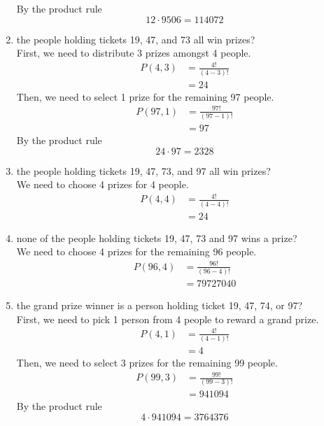 \documentclass[a4paper]{article}
\begin{document}
\begin{enumerate}[label = \textbf{\alph*)}]
		By the product rule
		\begin{equation*}
		12 \cdot 9506 = 114072
		\end{equation*}
		\item the people holding tickets 19, 47, and 73 all win prizes? \\
		First, we need to distribute 3 prizes amongst 4 people.
		\begin{align*}
		P(4,3) & = \frac{4!}{(4-3)!} \\
		& = 24 
		\end{align*}
		Then, we need to select 1 prize for the remaining 97 people.
		\begin{align*}
		P(97,1) & = \frac{97!}{(97-1)!} \\
		& = 97
		\end{align*}
		By the product rule
		\begin{equation*}
		24 \cdot 97 = 2328
		\end{equation*}
		\item the people holding tickets 19, 47, 73, and 97 all win prizes? \\
		We need to choose 4 prizes for 4 people.
		\begin{align*}
		P(4,4) & = \frac{4!}{(4-4)!} \\
		& = 24
		\end{align*}
		\item none of the people holding tickets 19, 47, 73 and 97 wins a prize? \\
		We need to choose 4 prizes for the remaining 96 people.
		\begin{align*}
		P(96,4) & = \frac{96!}{(96-4)!} \\
		& = 79727040
		\end{align*}
		\item the grand prize winner is a person holding ticket 19, 47, 74, or 97? \\
		First, we need to pick 1 person from 4 people to reward a grand prize.
		\begin{align*}
		P(4,1) & = \frac{4!}{(4-1)!} \\
		& = 4
		\end{align*}
		Then, we need to select 3 prizes for the remaining 99 people.
		\begin{align*}
		P(99,3) & = \frac{99!}{(99-3)!} \\
		& = 941094
		\end{align*}
		By the product rule
		\begin{equation*}
		4 \cdot 941094 = 3764376	

\end{equation*}
\end{enumerate}
\end{document}
